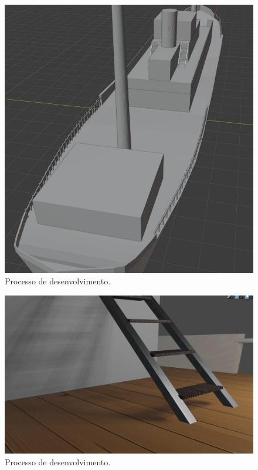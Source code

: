\begin{figure}[!h]
    \centering
    \includegraphics[scale=0.5]{imagens/p7.jpg}
    \caption{Processo de desenvolvimento.}
    \label{fig:p7}
\end{figure}

\begin{figure}[!h]
    \centering
    \includegraphics[scale=0.5]{imagens/p8.jpg}
    \caption{Processo de desenvolvimento.}
    \label{fig:p8}
\end{figure}

